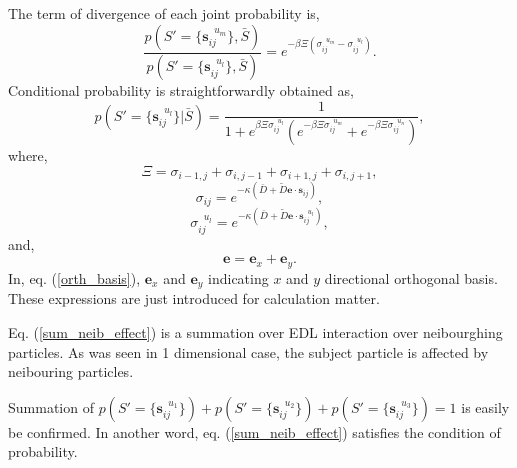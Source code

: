 \documentclass{article}
\begin{document}
The term of divergence of each joint probability is,
\begin{equation}
 \frac{p(S'=\{\bm{s}^{\mspace{10mu}u_m}_{ij}\}, \bar{S})}{p(S'=\{\bm{s}^{\mspace{10mu}u_l}_{ij}\}, \bar{S})}
  = e^{-\beta\Xi(\sigma^{\mspace{10mu}u_m}_{ij} - \sigma^{\mspace{10mu}u_l}_{ij})}.
\end{equation}
Conditional probability is straightforwardly obtained as,
\begin{equation}
 p\left(S'=\{\bm{s}^{\mspace{10mu}u_l}_{ij}\}|\bar{S}\right) = 
  \frac{1}{1
  + e^{\beta\Xi\sigma^{\mspace{10mu}u_l}_{ij}}\left(
					      e^{-\beta\Xi\sigma^{\mspace{10mu}u_m}_{ij}}
					      + e^{-\beta\Xi\sigma^{\mspace{10mu}u_n}_{ij}}\right)
  }, \label{2d_cond_prob}
\end{equation}
where,
\begin{equation}
 \Xi = \sigma_{i-1, j} + \sigma_{i, j-1} + \sigma_{i+1, j} + \sigma_{i, j+1},   \label{sum_neib_effect}
\end{equation}
\begin{equation}
 \sigma_{ij} = e^{-\kappa (\bar{D} + \tilde{D}\bm{e}\cdot\bm{s}_{ij})},
\end{equation}
\begin{equation}
 \sigma^{\mspace{10mu}u_l}_{ij} = e^{-\kappa (\bar{D} + \tilde{D}\bm{e}\cdot\bm{s}^{\mspace{10mu}u_l}_{ij})},
\end{equation}
and,
\begin{equation}
 \bm{e} = \bm{e}_x + \bm{e}_y.  \label{orth_basis}
\end{equation}
In, eq. (\ref{orth_basis}), $\bm{e}_x$ and $\bm{e}_y$ indicating $x$ and $y$ directional orthogonal basis.
These expressions are just introduced for calculation matter.

Eq. (\ref{sum_neib_effect}) is a summation over EDL interaction over neibourghing particles.
As was seen in 1 dimensional case, the subject particle is affected by neibouring particles.

Summation of $p(S'=\{\bm{s}_{ij}^{\mspace{10mu}u_1}\}) + p(S'=\{\bm{s}_{ij}^{\mspace{10mu}u_2}\}) + p(S'=\{\bm{s}_{ij}^{\mspace{10mu}u_3}\}) = 1$
 is easily be confirmed. In another word, eq. (\ref{sum_neib_effect}) satisfies the condition of probability.
\end{document}
